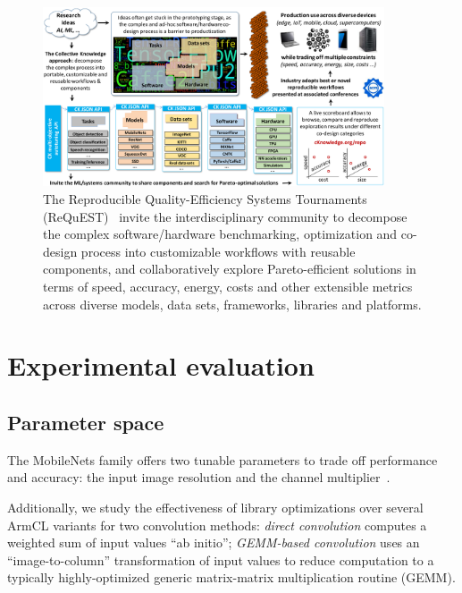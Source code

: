\documentclass[sigplan]{acmart}
\begin{document}
\begin{figure}[htb]
% 
  \centering
%
  \includegraphics[width=0.9\textwidth]{figures/ck-request-concept-cropped.pdf}
%  
  \caption{The Reproducible Quality-Efficiency Systems Tournaments
(ReQuEST)~\cite{cm:29db2248aba45e59:0c7348dfbadd5b95} invite the
interdisciplinary community to decompose the complex software/hardware
benchmarking, optimization and co-design process into customizable workflows
with reusable components, and collaboratively explore Pareto-efficient
solutions in terms of speed, accuracy, energy, costs and other extensible
metrics across diverse models, data sets, frameworks, libraries and platforms.}
%
  \label{fig:ck-request-concept}
%
\end{figure}

\section{Experimental evaluation}
\label{sec:evaluation}

\subsection{Parameter space}

The MobileNets family offers two tunable parameters to trade off performance
and accuracy: the input image resolution and the channel
multiplier~\cite{Howard:MobileNets-v1}. 

Additionally, we study the effectiveness of library optimizations over several
ArmCL variants for two convolution methods: {\em direct convolution} computes a
weighted sum of input values ``ab initio''; {\em GEMM-based convolution} uses
an ``image-to-column'' transformation of input values to reduce computation to
a typically highly-optimized generic matrix-matrix multiplication routine
(GEMM).
\end{document}
